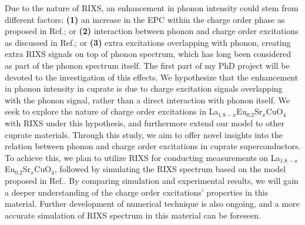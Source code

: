 \documentclass[11pt]{article}
\begin{document}
Due to the nature of RIXS, an enhancement in phonon intensity could stem from different factors: \textbf{(1)} an increase in the EPC within the charge order phase as proposed in Ref.\cite{wang_charge_2021,peng_electronic_2022}; 
or \textbf{(2)} interaction between phonon and charge order excitations as discussed in Ref.\cite{li_multiorbital_2020, chaix_dispersive_2017,huang_quantum_2021}; 
or \textbf{(3)} extra excitations overlapping with phonon, creating extra RIXS signals on top of phonon spectrum, which has long been considered as part of the phonon spectrum itself. 
The first part of my PhD project will be devoted to the investigation of this effects.
We hypothesize that the enhancement in phonon intensity in cuprate is due to charge excitation signals overlapping with the phonon signal, rather than a direct interaction with phonon itself.  
We seek to explore the nature of charge order excitations in {La$_{1.8-x}$Eu$_{0.2}$Sr$_x$CuO$_{4}$} with RIXS under this hypothesis, and furthermore extend our model to other cuprate materials. 
Through this study, we aim to offer novel insights into the relation between phonon and charge order excitations in cuprate superconductors. 
To achieve this, we plan to utilize RIXS for conducting measurements on {La$_{1.8-x}$Eu$_{0.2}$Sr$_x$CuO$_{4}$}, followed by simulating the RIXS spectrum based on the model proposed in Ref.\cite{devereaux_directly_2016}. 
By comparing simulation and experimental results, we will gain a deeper understanding of the charge order excitations' properties in this material. 
Further development of numerical technique is also ongoing, and a more accurate simulation of RIXS spectrum in this material can be foreseen.
\end{document}
